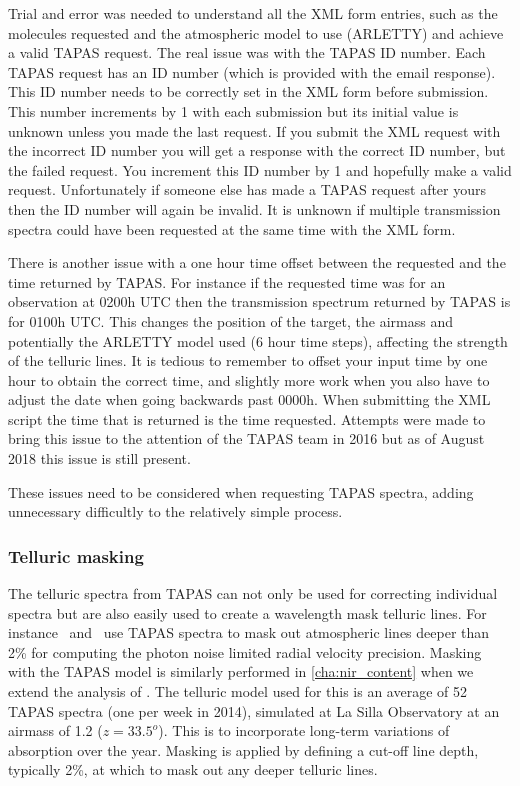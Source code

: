 Trial and error was needed to understand all the {XML} form entries, such as the molecules requested and the atmospheric model to use ({ARLETTY}) and achieve a valid {TAPAS} request.
The real issue was with the {TAPAS} {{ID}} number.
Each {TAPAS} request has an {ID} number (which is provided with the email response).
This {ID} number needs to be correctly set in the {XML} form before submission.
This number increments by 1 with each submission but its initial value is unknown unless you made the last request.
If you submit the {XML} request with the incorrect {ID} number you will get a response with the correct {ID} number, but the failed request.
You increment this {ID} number by 1 and hopefully make a valid request.
Unfortunately if someone else has made a {TAPAS} request after yours then the {ID} number will again be invalid.
It is unknown if multiple transmission spectra could have been requested at the same time with the {XML} form.

There is another issue with a one hour time offset between the requested and the time returned by {TAPAS}.
For instance if the requested time was for an observation at 0200h {UTC} then the transmission spectrum returned by {TAPAS} is for 0100h {UTC}.
This changes the position of the target, the airmass and potentially the {ARLETTY} model used (6 hour time steps), affecting the strength of the telluric lines.
It is tedious to remember to offset your input time by one hour to obtain the correct time, and slightly more work when you also have to adjust the date when going backwards past 0000h.
When submitting the {XML} script the time that is returned is the time requested.
Attempts were made to bring this issue to the attention of the {TAPAS} team in 2016 but as of August 2018 this issue is still present.

These issues need to be considered when requesting {TAPAS} spectra, adding unnecessary difficultly to the relatively simple process.


\subsubsection{Telluric masking}
The telluric spectra from {TAPAS} can not only be used for correcting individual spectra but are also easily used to create a wavelength mask telluric lines.
For instance~\citet{figueira_radial_2016} and~\citet{artigau_optical_2018} use {TAPAS} spectra to mask out atmospheric lines deeper than 2\% for computing the photon noise limited radial velocity precision.
Masking with the {TAPAS} model is similarly performed in \cref{cha:nir_content} when we extend the analysis of \citet{figueira_radial_2016}.
The telluric model used for this is an average of 52 {TAPAS} spectra (one per week in 2014), simulated at La Silla Observatory at an airmass of 1.2 (\(z = 33.5^{o}\)).
This is to incorporate long-term variations of absorption over the year.
Masking is applied by defining a cut-off line depth, typically 2\%, at which to mask out any deeper telluric lines.


